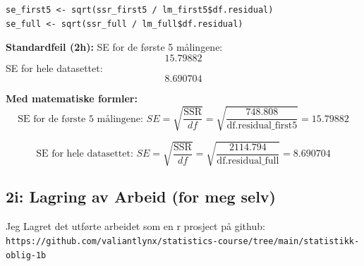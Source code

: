 \documentclass{article}
\begin{document}
\begin{lstlisting}[style=Rstyle]
se_first5 <- sqrt(ssr_first5 / lm_first5$df.residual)
se_full <- sqrt(ssr_full / lm_full$df.residual)
\end{lstlisting}
\textbf{Standardfeil (2h):} SE for de første 5 målingene: \[ 15.79882 \]
SE for hele datasettet: \[ 8.690704 \]

\textbf{Med matematiske formler:}
\[ \text{SE for de første 5 målingene: } SE = \sqrt{\frac{\text{SSR}}{df}} = \sqrt{\frac{748.808}{\text{df.residual\_first5}}} = 15.79882 \]

\[ \text{SE for hele datasettet: } SE = \sqrt{\frac{\text{SSR}}{df}} = \sqrt{\frac{2114.794}{\text{df.residual\_full}}} = 8.690704 \]


\subsection{2i: Lagring av Arbeid (for meg selv)}
Jeg Lagret det utførte arbeidet som en r prosject på github: \\ 
\texttt{https://github.com/valiantlynx/statistics-course/tree/main/statistikk-oblig-1b}
\end{document}
